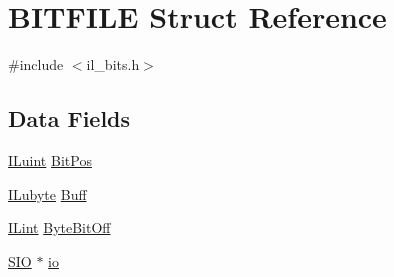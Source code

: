 \hypertarget{struct_b_i_t_f_i_l_e}{\section{B\-I\-T\-F\-I\-L\-E Struct Reference}
\label{struct_b_i_t_f_i_l_e}
}


{\ttfamily \#include $<$il\-\_\-bits.\-h$>$}

\subsection*{Data Fields}
\begin{DoxyCompactItemize}
\item 
\hyperlink{il_8h_ac6508d0e9c19e32f32e00d54b5b8cf30}{I\-Luint} \hyperlink{struct_b_i_t_f_i_l_e_a380a5ab3a7e2398e9655769a7ec6a8b1}{Bit\-Pos}
\item 
\hyperlink{il_8h_a8d2f04500100a86d1b00e98ab1b15a33}{I\-Lubyte} \hyperlink{struct_b_i_t_f_i_l_e_a53cea2a5fc6fa367fe79be9c4564df3f}{Buff}
\item 
\hyperlink{il_8h_a288a97fb9e92e707a60b749d0039fafe}{I\-Lint} \hyperlink{struct_b_i_t_f_i_l_e_a1ac5917c39a2f4558be81522bc7c558a}{Byte\-Bit\-Off}
\item 
\hyperlink{struct_s_i_o}{S\-I\-O} $\ast$ \hyperlink{struct_b_i_t_f_i_l_e_ab6115e5993ca62edfb3a32ef981294c5}{io}
\end{DoxyCompactItemize}


